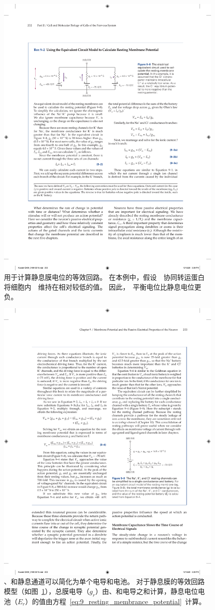\begin{figure}[htbp]
	\centering
	\includegraphics[width=0.7\linewidth]{chap09/fig_9_8}
	\caption{用于计算静息膜电位的等效回路。
		在本例中，假设~~协同转运蛋白将细胞内~~维持在相对较低的值。
		因此，~平衡电位比静息电位更负。}
	\label{fig:9_8}
\end{figure}


\begin{figure}[htbp]
	\centering
	\includegraphics[width=0.5\linewidth]{chap09/fig_9_9}
	\caption{、和静息通道可以简化为单个电导和电池。
		对于静息膜的等效回路模型（如图~\ref{fig:9_8}），总膜电导（$ g_r $）由、和电导之和计算，静息电位电池（$ E_r $）的值由方程~\ref{eq:9_resting_membrance_potential}~计算。}
	\label{fig:9_9}
\end{figure}


